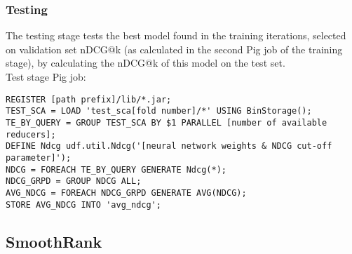 \subsubsection{Testing}
The testing stage tests the best model found in the training iterations, selected on validation set \ac{nDCG}@k (as calculated in the second Pig job of the training stage), by calculating the \ac{nDCG}@k of this model on the test set.\\

Test stage Pig job:\\
\begin{minipage}{\linewidth}
\begin{lstlisting}
REGISTER [path prefix]/lib/*.jar;
TEST_SCA = LOAD 'test_sca[fold number]/*' USING BinStorage();
TE_BY_QUERY = GROUP TEST_SCA BY $1 PARALLEL [number of available reducers];
DEFINE Ndcg udf.util.Ndcg('[neural network weights & NDCG cut-off parameter]');
NDCG = FOREACH TE_BY_QUERY GENERATE Ndcg(*);
NDCG_GRPD = GROUP NDCG ALL;
AVG_NDCG = FOREACH NDCG_GRPD GENERATE AVG(NDCG);
STORE AVG_NDCG INTO 'avg_ndcg';
\end{lstlisting}
\end{minipage}

\subsection{SmoothRank}